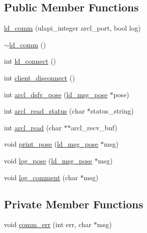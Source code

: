 \subsection*{Public Member Functions}
\begin{DoxyCompactItemize}
\item 
\mbox{\hyperlink{classld__comm_afecf4465db68994a6c4c6024338498c8}{ld\+\_\+comm}} (ulapi\+\_\+integer arcl\+\_\+port, bool log)
\item 
\mbox{\hyperlink{classld__comm_af403b74c6732802512b416fdcecef916}{$\sim$ld\+\_\+comm}} ()
\item 
int \mbox{\hyperlink{classld__comm_a8cd32085a2ad22929e381ffce3fed103}{ld\+\_\+connect}} ()
\item 
int \mbox{\hyperlink{classld__comm_ad9a9140d9e21ae6c991dda317808acce}{client\+\_\+disconnect}} ()
\item 
int \mbox{\hyperlink{classld__comm_a735b4f8a86715cd2fde806ae6f7ba6b3}{arcl\+\_\+dsfv\+\_\+pose}} (\mbox{\hyperlink{structld__msg__pose}{ld\+\_\+msg\+\_\+pose}} $\ast$pose)
\item 
int \mbox{\hyperlink{classld__comm_a936a049861974c0ffa5d836a1364aa03}{arcl\+\_\+read\+\_\+status}} (char $\ast$status\+\_\+string)
\item 
int \mbox{\hyperlink{classld__comm_afaca1d34911ee06e0b8d07efd3a074d3}{arcl\+\_\+read}} (char $\ast$$\ast$arcl\+\_\+recv\+\_\+buf)
\item 
void \mbox{\hyperlink{classld__comm_aceb15ae4635e8033ec46cb1a54a99c1f}{print\+\_\+pose}} (\mbox{\hyperlink{structld__msg__pose}{ld\+\_\+msg\+\_\+pose}} $\ast$msg)
\item 
void \mbox{\hyperlink{classld__comm_a1219ef460b9a510a448704f57ce0412e}{log\+\_\+pose}} (\mbox{\hyperlink{structld__msg__pose}{ld\+\_\+msg\+\_\+pose}} $\ast$msg)
\item 
void \mbox{\hyperlink{classld__comm_ad47e957c7397e42e82128ee143d8b143}{log\+\_\+comment}} (char $\ast$msg)
\end{DoxyCompactItemize}
\subsection*{Private Member Functions}
\begin{DoxyCompactItemize}
\item 
void \mbox{\hyperlink{classld__comm_a311097d66efbc4d7d765945ed5857675}{comm\+\_\+err}} (int err, char $\ast$msg)
\end{DoxyCompactItemize}

